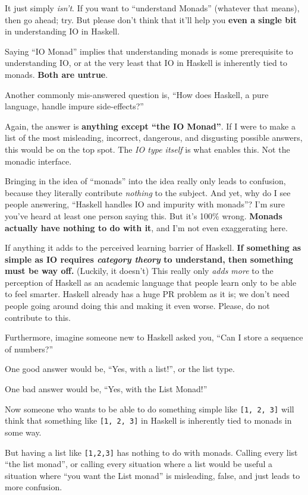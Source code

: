 \documentclass[]{article}
\begin{document}
It just simply \emph{isn't}. If you want to ``understand Monads''
(whatever that means), then go ahead; try. But please don't think that
it'll help you \textbf{even a single bit} in understanding IO in
Haskell.

Saying ``IO Monad'' implies that understanding monads is some
prerequisite to understanding IO, or at the very least that IO in
Haskell is inherently tied to monads. \textbf{Both are untrue}.

Another commonly mis-answered question is, ``How does Haskell, a pure
language, handle impure side-effects?''

Again, the answer is \textbf{anything except ``the IO Monad''}. If I
were to make a list of the most misleading, incorrect, dangerous, and
disgusting possible answers, this would be on the top spot. The \emph{IO
type itself} is what enables this. Not the monadic interface.

Bringing in the idea of ``monads'' into the idea really only leads to
confusion, because they literally contribute \emph{nothing} to the
subject. And yet, why do I see people answering, ``Haskell handles IO
and impurity with monads''? I'm sure you've heard at least one person
saying this. But it's 100\% wrong. \textbf{Monads actually have nothing
to do with it}, and I'm not even exaggerating here.

If anything it adds to the perceived learning barrier of Haskell.
\textbf{If something as simple as IO requires \emph{category theory} to
understand, then something must be way off.} (Luckily, it doesn't) This
really only \emph{adds more} to the perception of Haskell as an academic
language that people learn only to be able to feel smarter. Haskell
already has a huge PR problem as it is; we don't need people going
around doing this and making it even worse. Please, do not contribute to
this.

Furthermore, imagine someone new to Haskell asked you, ``Can I store a
sequence of numbers?''

One good answer would be, ``Yes, with a list!'', or the list type.

One bad answer would be, ``Yes, with the List Monad!''

Now someone who wants to be able to do something simple like
\texttt{{[}1,\ 2,\ 3{]}} will think that something like
\texttt{{[}1,\ 2,\ 3{]}} in Haskell is inherently tied to monads in some
way.

But having a list like \texttt{{[}1,2,3{]}} has nothing to do with
monads. Calling every list ``the list monad'', or calling every
situation where a list would be useful a situation where ``you want the
List monad'' is misleading, false, and just leads to more confusion.
\end{document}
